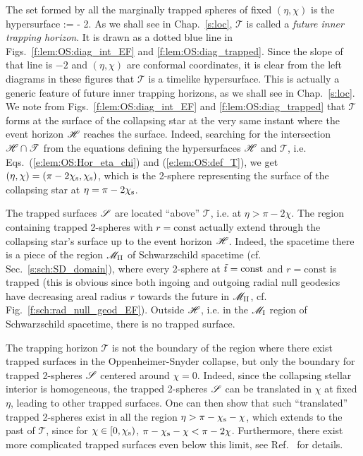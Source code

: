 The set formed by all the marginally trapped spheres of fixed $(\eta,\chi)$
is the hypersurface
\be \label{e:lem:OS:def_T}
    :\qquad \eta = \pi - 2\chi.
\ee
As we shall see in
Chap.~\ref{s:loc}, $\mathscr{T}$ is called a \emph{future inner trapping horizon}.
It is drawn as a dotted blue line in Figs.~\ref{f:lem:OS:diag_int_EF}
and \ref{f:lem:OS:diag_trapped}. Since the slope of that line is $-2$ and
$(\eta,\chi)$ are conformal coordinates, it is clear from the left diagrams
in these figures that $\mathscr{T}$ is a timelike hypersurface. This is
actually a generic feature of future inner trapping horizons, as we shall
see in Chap.~\ref{s:loc}. We note from Figs.~\ref{f:lem:OS:diag_int_EF}
and \ref{f:lem:OS:diag_trapped} that $\mathscr{T}$ forms at the surface of the
collapsing star at the very same instant where the event horizon $\mathscr{H}$
reaches the surface.
Indeed, searching for the intersection $\mathscr{H}\cap\mathscr{T}$ from the equations
defining the hypersurfaces $\mathscr{H}$ and $\mathscr{T}$, i.e. Eqs.~(\ref{e:lem:OS:Hor_eta_chi})
and (\ref{e:lem:OS:def_T}), we get
$(\eta,\chi) = (\pi - 2\chi_{\rm s}, \chi_{\rm s})$, which is the 2-sphere
representing the surface of the collapsing star at $\eta=\pi - 2 \chi_{\rm s}$.

The trapped surfaces $\mathscr{S}$ are located ``above'' $\mathscr{T}$, i.e. at
$\eta > \pi - 2 \chi$. The region containing trapped 2-spheres with $r=\mathrm{const}$ actually extend through the collapsing star's surface up to the event horizon $\mathscr{H}$. Indeed, the spacetime there
is a piece of the region $\mathscr{M}_{\rm II}$ of Schwarzschild spacetime (cf. Sec.~\ref{s:sch:SD_domain}),
where every 2-sphere at ${\tilde t} = \mathrm{const}$ and $r=\mathrm{const}$ is trapped (this is obvious
since both ingoing and outgoing radial null geodesics have decreasing areal radius $r$
towards the future in $\mathscr{M}_{\rm II}$, cf. Fig.~\ref{f:sch:rad_null_geod_EF}).
Outside $\mathscr{H}$, i.e. in the $\mathscr{M}_{\rm I}$ region of Schwarzschild spacetime, there is no trapped
surface.

\begin{remark}
The trapping horizon $\mathscr{T}$ is not the boundary of the region where there
exist trapped surfaces
in the Oppenheimer-Snyder collapse, but only the boundary for trapped 2-spheres $\mathscr{S}$
centered around $\chi=0$.
Indeed, since the collapsing stellar interior
is homogeneous, the trapped 2-spheres $\mathscr{S}$ can
be translated in $\chi$ at fixed $\eta$, leading to other trapped surfaces.
One can then show that such ``translated'' trapped 2-spheres exist in all the region
$\eta > \pi - \chi_{\rm s} - \chi$, which extends to the past of $\mathscr{T}$,
since for $\chi\in[0, \chi_{\rm s})$,  %
$ \pi - \chi_{\rm s} - \chi < \pi - 2\chi$.
Furthermore, there exist more complicated trapped surfaces even below
this limit, see Ref.~\cite{BengtJS13} for details.
\end{remark}


